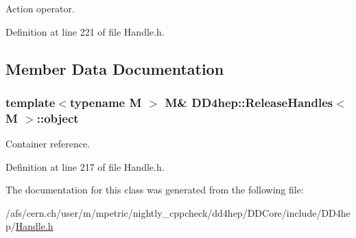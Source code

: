 Action operator. 

Definition at line 221 of file Handle.h.

\subsection{Member Data Documentation}
\hypertarget{class_d_d4hep_1_1_release_handles_a859c2b05fd3a51dbbeee2b6937a19068}{
\subsubsection[{object}]{\setlength{\rightskip}{0pt plus 5cm}template$<$typename M $>$ M\& {\bf DD4hep::ReleaseHandles}$<$ M $>$::{\bf object}}}
\label{class_d_d4hep_1_1_release_handles_a859c2b05fd3a51dbbeee2b6937a19068}


Container reference. 

Definition at line 217 of file Handle.h.

The documentation for this class was generated from the following file:\begin{DoxyCompactItemize}
\item 
/afs/cern.ch/user/m/mpetric/nightly\_\-cppcheck/dd4hep/DDCore/include/DD4hep/\hyperlink{_handle_8h}{Handle.h}\end{DoxyCompactItemize}

